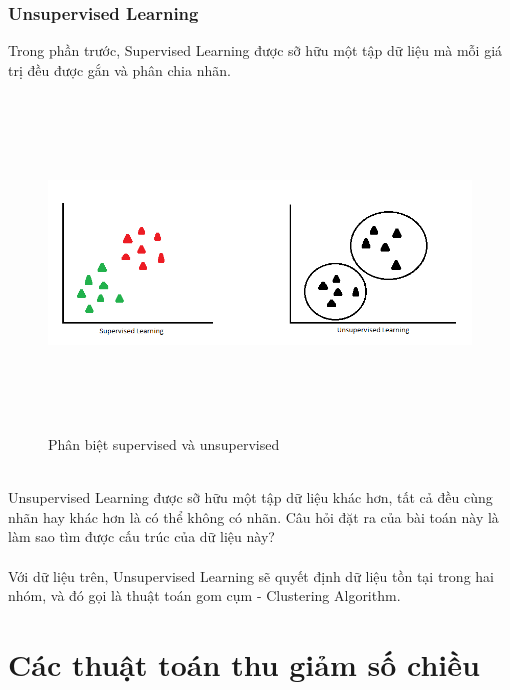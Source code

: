 \subsubsection{Unsupervised Learning}
Trong phần trước, Supervised Learning được sỡ hữu một tập dữ liệu mà mỗi giá trị
đều được gắn và phân chia nhãn.\\
\begin{figure}[h!]
  	\centering
	\includegraphics[width=5in,height=3.5in,keepaspectratio=true]{KhongGiamSat.png}
	\caption{Phân biệt supervised và unsupervised}
\end{figure}\\
Unsupervised Learning được sỡ hữu một tập dữ liệu khác hơn, tất cả đều cùng nhãn
hay khác hơn là có thể không có nhãn. Câu hỏi đặt ra của bài toán này là làm sao
tìm được cấu trúc của dữ liệu này?\\\\
Với dữ liệu trên, Unsupervised Learning
sẽ quyết định dữ liệu tồn tại trong hai nhóm, và đó gọi là thuật toán gom cụm -
Clustering Algorithm.
\section{Các thuật toán thu giảm số chiều}

